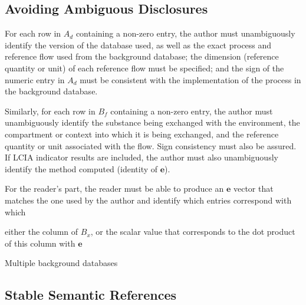 \subsection{Avoiding Ambiguous Disclosures}




For each row in $A_d$ containing a non-zero entry, the author must unambiguously identify the version of the database used, as well as the exact process and reference flow used from the background database; the dimension (reference quantity or unit) of each reference flow must be specified; and the sign of the numeric entry in $A_d$ must be consistent with the implementation of the process in the background database.  


Similarly, for each row in $B_f$ containing a non-zero entry, the author must unambiguously identify the substance being exchanged with the environment, the compartment or context into which it is being exchanged, and the reference quantity or unit associated with the flow.  Sign consistency must also be assured.  If LCIA indicator results are included, the author must also unambiguously identify the method computed (identity of $\mathbf{e}$).  

For the reader's part, the reader must be able to produce an $\mathbf{e}$ vector that matches the one used by the author and identify which entries correspond with which 

either the column of $B_x$, or the scalar value that corresponds to the dot product of this column with $\mathbf{e}$


Multiple background databases


\subsection{Stable Semantic References}

